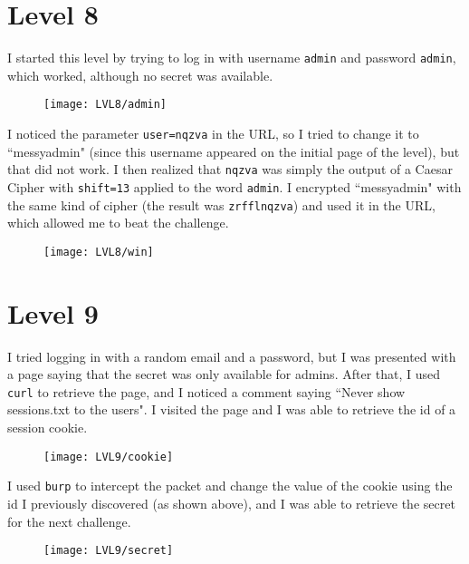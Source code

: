 \documentclass[12pt,a4paper]{article}
\begin{document}
	\section*{Level 8}
	I started this level by trying to log in with username \texttt{admin} and password \texttt{admin}, which worked, although no secret was available.
	\begin{figure}[H]
		\centering
		\texttt{[image: LVL8/admin]}
		\label{fig:admin8}
	\end{figure}
	
	I noticed the parameter \texttt{user=nqzva} in the URL, so I tried to change it to ``messyadmin" (since this username appeared on the initial page of the level), but that did not work. I then realized that \texttt{nqzva} was simply the output of a Caesar Cipher with \texttt{shift=13} applied to the word \texttt{admin}. I encrypted ``messyadmin" with the same kind of cipher (the result was \texttt{zrfflnqzva}) and used it in the URL, which allowed me to beat the challenge.
	\begin{figure}[H]
		\centering
		\texttt{[image: LVL8/win]}
		\label{fig:win8}
	\end{figure}

	\section*{Level 9}
I tried logging in with a random email and a password, but I was presented with a page saying that the secret was only available for admins. After that, I used \texttt{curl} to retrieve the page, and I noticed a comment saying ``Never show sessions.txt to the users". I visited the page and I was able to retrieve the id of a session cookie.
	\begin{figure}[H]
		\centering
		\texttt{[image: LVL9/cookie]}
		\label{fig:cookie9}
	\end{figure}
	I used \texttt{burp} to intercept the packet and change the value of the cookie using the id I previously discovered (as shown above), and I was able to retrieve the secret for the next challenge.
	\begin{figure}[H]
		\centering
		\texttt{[image: LVL9/secret]}
		\label{fig:secret9}
	\end{figure}
	
\end{document}
